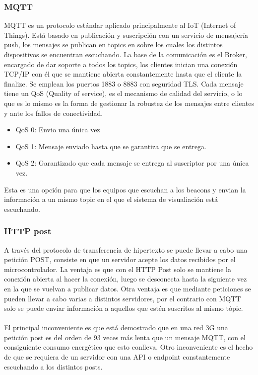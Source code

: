\documentclass[a4paper ,12pt, onecolumn]{article}
\begin{document}
\begin{enumerate}
        \subsubsection {MQTT}
            MQTT es un protocolo estándar aplicado principalmente al IoT (Internet of Things). Está basado en publicación y 
            suscripción con un servicio de mensajería push, los mensajes se publican en topics en sobre los cuales los distintos 
            dispositivos se encuentran escuchando.
            La base de la comunicación es el Broker, encargado de dar soporte a todos los topics, los clientes inician una 
            conexión TCP/IP con él que se mantiene abierta constantemente hasta que el cliente la finalize. Se emplean los puertos
            1883 o 8883 con seguridad TLS.
            Cada mensaje tiene un QoS (Quality of service), es el mecanismo de calidad del servicio, o lo que es lo mismo es la forma de
            gestionar la robustez de los mensajes entre clientes  y ante los fallos de conectividad.
            \begin{itemize}
                \item QoS 0: Envio una única vez
                \item QoS 1: Mensaje enviado hasta que se garantiza que se entrega.
                \item QoS 2: Garantizado que cada mensaje se entrega al suscriptor por una única vez.
            \end{itemize}
            Esta es una opción para que los equipos que escuchan a los beacons y envian la información a un mismo
            topic en el que el sistema de visualiación está escuchando.
        \subsubsection {HTTP post}
            A través del protocolo de transferencia de hipertexto se puede llevar a cabo una petición POST, consiste en que
            un servidor acepte los datos recibidos por el microcontrolador.
            La ventaja es que con el HTTP Post solo se mantiene la conexión abierta al hacer la conexión, luego se desconecta hasta 
            la siguiente vez en la que se vuelvan a publicar datos. Otra ventaja es que mediante peticiones se pueden llevar a 
            cabo varias a distintos servidores, por el contrario con MQTT solo se puede enviar información a aquellos que estén
            suscritos al mismo tópic.
            \paragraph{}
            El principal inconveniente es que está demostrado que en una red 3G una petición post es del orden de 93 veces
            más lenta que un mensaje MQTT, con el consiguiente consumo energético que esto conlleva. Otro inconveniente es el hecho 
            de que se requiera de un servidor con una API o endpoint constantemente escuchando a los distintos posts.

\end{enumerate}
\end{document}
